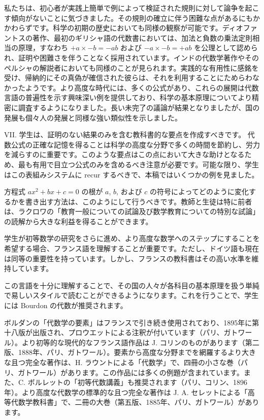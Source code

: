 \documentclass[a4paper,11pt,openany]{ltjsbook}
\begin{document}
私たちは、初心者が実践上簡単で例によって検証された規則に対して論争を起こす傾向がないことに気づきました。その規則の確立に伴う困難な点があるにもかかわらずです。科学の初期の歴史においても同様の観察が可能です。ディオファントスの著作、最初のギリシャ語の代数書においては、加法と負数の乗法定則相当の原理，すなわち $+a \times -b = -ab$ および $-a \times -b = +ab$ を公理として認められ、証明や困難さを伴うことなく採用されています。インドの代数学著作やそのペルシャの解説者においても同様のことが見られます。実践的な有用性に感銘を受け、帰納的にその真偽が確信された彼らは、それを利用することにためらわなかったようです。より高度な時代には、多くの公式があり、これらの展開は代数言語の普遍性を示す興味深い例を提供しており、科学の基本原理についてより精密に調査するようになりました。長い未完了の議論が結果となりましたが、国の発展も個々人の発展と同様な強い類似性を示しました。

VII. 学生は、証明のない結果のみを含む教科書的な要点を作成すべきです。
代数公式の正確な記憶を得ることは科学の高度な分野で多くの時間を節約し、労力を減らすのに重要です。このような要点はこの点において大きな助けとなるため、最も有用で目立つ公式のみを含めるべき注意が必要です。可能な限り、学生はこの表組みシステムに recur するべきで、本稿ではいくつかの例を見ました。

方程式 \(ax^{2} + bx + c = 0\) の根が \(a\), \(b\), および \(c\) の符号によってどのように変化するかを書き出す方法は、このようにして行うべきです。教師と生徒は特に前者は、ラクロワの「教育一般についての試論及び数学教育についての特別な試論」の読解から大きな利益を得ることができます。

学生が初等数学の研究をさらに進め、より高度な数学へのステップにすることを希望する場合、フランス語を理解することが重要です。ただし、ドイツ語も現在は同等の重要性を持っています。しかし、フランスの教科書はその高い水準を維持しています。

この言語を十分に理解することで、その国の人々が各科目の基本原理を扱う単純で易しいスタイルで読むことができるようになります。これを行うことで、学生には Bourdon の代数が推奨されます。

ボルダンの「代数学の要素」はフランスで引き続き使用されており、1895年に第十八版が出版され、プロウエットによる注釈が付いています（パリ、ガトワール）。より初等的な現代的なフランス語作品は J. コリンのものがあります（第二版、1888年、パリ、ガトワール）。要素から高度な分野までを網羅するより大きな且つ完全な著作は、H. ラウントによる「代数学」で、四冊の小さな巻（パリ、ガトワール）があります。この作品には多くの例題が含まれています。また、C. ボルレットの「初等代数講義」も推奨されます（パリ、コリン、1896年）。より高度な代数学の標準的な且つ完全な著作は J. A. セレットによる「高等代数学教科書」で、二冊の大巻（第五版、1885年、パリ、ガトワール）があります。
\end{document}
